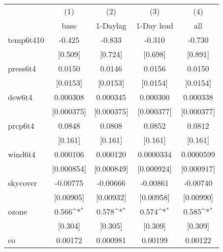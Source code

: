 {
\def\sym#1{\ifmmode^{#1}\else\(^{#1}\)\fi}
\begin{tabular}{l*{4}{c}}
\hline\hline
            &\multicolumn{1}{c}{(1)}&\multicolumn{1}{c}{(2)}&\multicolumn{1}{c}{(3)}&\multicolumn{1}{c}{(4)}\\
            &\multicolumn{1}{c}{base}&\multicolumn{1}{c}{1-Daylag}&\multicolumn{1}{c}{1-Day lead}&\multicolumn{1}{c}{all}\\
\hline
temp6t410   &      -0.425         &      -0.833         &      -0.310         &      -0.730         \\
            &     [0.509]         &     [0.724]         &     [0.698]         &     [0.891]         \\
[1em]
press6t4    &      0.0150         &      0.0146         &      0.0156         &      0.0150         \\
            &    [0.0153]         &    [0.0153]         &    [0.0154]         &    [0.0154]         \\
[1em]
dew6t4      &    0.000308         &    0.000345         &    0.000300         &    0.000338         \\
            &  [0.000375]         &  [0.000375]         &  [0.000377]         &  [0.000377]         \\
[1em]
prcp6t4     &      0.0848         &      0.0808         &      0.0852         &      0.0812         \\
            &     [0.161]         &     [0.161]         &     [0.161]         &     [0.161]         \\
[1em]
wind6t4     &    0.000106         &    0.000120         &   0.0000334         &   0.0000599         \\
            &  [0.000854]         &  [0.000849]         &  [0.000924]         &  [0.000917]         \\
[1em]
skycover    &    -0.00775         &    -0.00666         &    -0.00861         &    -0.00740         \\
            &   [0.00905]         &   [0.00932]         &   [0.00958]         &   [0.00990]         \\
[1em]
ozone       &       0.566\sym{*}  &       0.578\sym{*}  &       0.574\sym{*}  &       0.585\sym{*}  \\
            &     [0.304]         &     [0.305]         &     [0.309]         &     [0.309]         \\
[1em]
co          &     0.00172         &    0.000981         &     0.00199         &     0.00122         \\

\end{tabular}}
